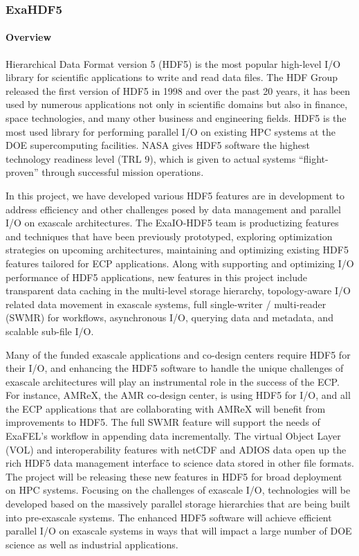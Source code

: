 \subsubsection{ ExaHDF5}\label{subsubsect:exahdf5}

\paragraph{Overview} 

Hierarchical Data Format version 5 (HDF5) is the most popular high-level I/O library for scientific applications to write and read data files. The HDF Group released the first version of HDF5 in 1998 and over the past 20 years, it has been used by numerous applications not only in scientific domains but also in finance, space technologies, and many other business and engineering fields. HDF5 is the most used library for performing parallel I/O on existing HPC systems at the DOE supercomputing facilities. NASA gives HDF5 software the highest technology readiness level (TRL 9), which is given to actual systems ``flight-proven'' through successful mission operations. 

In this project, we have developed various HDF5 features are in development to address efficiency and other challenges posed by data management and parallel I/O on exascale architectures. The ExaIO-HDF5 team is productizing features and techniques that have been previously prototyped, exploring optimization strategies on upcoming architectures, maintaining and optimizing existing HDF5 features tailored for ECP applications. Along with supporting and optimizing I/O performance of HDF5 applications, new features in this project include transparent data caching in the multi-level storage hierarchy, topology-aware I/O related data movement in exascale systems, full single-writer / multi-reader (SWMR) for workflows, asynchronous I/O, querying data and metadata, and scalable sub-file I/O. 

Many of the funded exascale applications and co-design centers require HDF5 for their I/O, and enhancing the HDF5 software to handle the unique challenges of exascale architectures will play an instrumental role in the success of the ECP. For instance, AMReX, the AMR co-design center, is using HDF5 for I/O, and all the ECP applications that are collaborating with AMReX will benefit from improvements to HDF5. The full SWMR feature will support the needs of ExaFEL’s workflow in appending data incrementally. The virtual Object Layer (VOL) and interoperability features with netCDF and ADIOS data open up the rich HDF5 data management interface to science data stored in other file formats. The project will be releasing these new features in HDF5 for broad deployment on HPC systems. Focusing on the challenges of exascale I/O, technologies will be developed based on the massively parallel storage hierarchies that are being built into pre-exascale systems. The enhanced HDF5 software will achieve efficient parallel I/O on exascale systems in ways that will impact a large number of DOE science as well as industrial applications.


